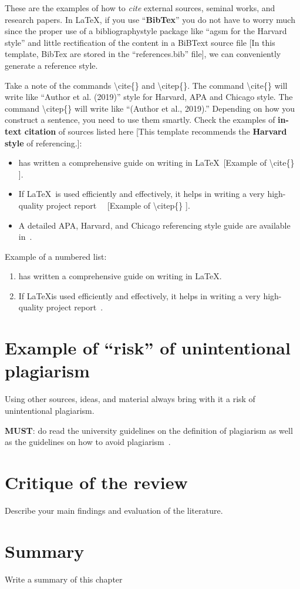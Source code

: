 These are the examples of how to \textit{cite} external sources, seminal works, and research papers. In \LaTeX, if you use ``\textbf{BibTex}'' you do not have to worry much since the proper use of a bibliographystyle package like ``agsm for the Harvard style'' and little rectification of the content in a BiBText source file [In this template, BibTex are stored in the ``references.bib'' file], we can conveniently generate  a reference style. 

Take a note of the commands \textbackslash cite\{\} and \textbackslash citep\{\}. The command \textbackslash cite\{\} will write like ``Author et al. (2019)'' style for Harvard, APA and Chicago style. The command \textbackslash citep\{\} will write like ``(Author et al., 2019).'' Depending on how you construct a sentence, you need to use them smartly. Check the examples of \textbf{in-text citation} of sources listed here [This template recommends the \textbf{Harvard style} of referencing.]:
\begin{itemize}
    \item \cite{lamport1994latex} has written a comprehensive guide on writing in \LaTeX ~[Example of \textbackslash cite\{\} ].
    \item If \LaTeX~is used efficiently and effectively, it helps in writing a very high-quality project report~\citep{lamport1994latex} ~[Example of \textbackslash citep\{\} ].   
    \item A detailed APA, Harvard, and Chicago referencing style guide are available in~\citep{uor_refernce_style}.
\end{itemize}

\noindent 
Example of a numbered list:
\begin{enumerate}
    \item \cite{lamport1994latex} has written a comprehensive guide on writing in \LaTeX.
    \item If \LaTeX is used efficiently and effectively, it helps in writing a very high-quality project report~\citep{lamport1994latex}.   
\end{enumerate}

\section{Example of ``risk'' of unintentional plagiarism}
Using other sources, ideas, and material always bring with it a risk of unintentional plagiarism. 

\noindent
\textbf{\color{red}MUST}: do read the university guidelines on the definition of plagiarism as well as the guidelines on how to avoid plagiarism~\citep{uor_plagiarism}.




\section{Critique of the review} %
Describe your main findings and evaluation of the literature. ~\\

\section{Summary} 
Write a summary of this chapter~\\
